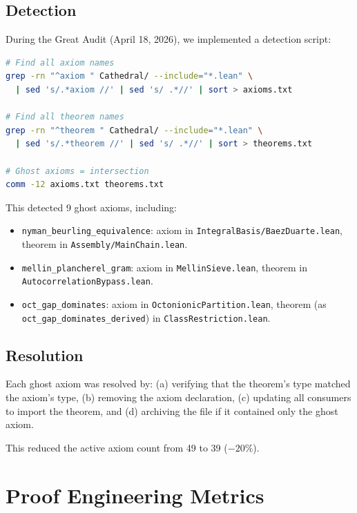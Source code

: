 \documentclass[11pt,a4paper]{article}
\theoremstyle{definition}
\newcommand{\lean}[1]{\texttt{#1}}
\begin{document}
\subsection{Detection}

During the Great Audit (April 18, 2026), we implemented a detection
script:

\begin{lstlisting}[language=bash,caption={Ghost axiom detection}]
# Find all axiom names
grep -rn "^axiom " Cathedral/ --include="*.lean" \
  | sed 's/.*axiom //' | sed 's/ .*//' | sort > axioms.txt

# Find all theorem names
grep -rn "^theorem " Cathedral/ --include="*.lean" \
  | sed 's/.*theorem //' | sed 's/ .*//' | sort > theorems.txt

# Ghost axioms = intersection
comm -12 axioms.txt theorems.txt
\end{lstlisting}

This detected 9 ghost axioms, including:
\begin{itemize}
  \item \lean{nyman\_beurling\_equivalence}: axiom in
    \lean{IntegralBasis/BaezDuarte.lean}, theorem in
    \lean{Assembly/MainChain.lean}.
  \item \lean{mellin\_plancherel\_gram}: axiom in
    \lean{MellinSieve.lean}, theorem in \lean{AutocorrelationBypass.lean}.
  \item \lean{oct\_gap\_dominates}: axiom in \lean{OctonionicPartition.lean},
    theorem (as \lean{oct\_gap\_dominates\_derived}) in
    \lean{ClassRestriction.lean}.
\end{itemize}

\subsection{Resolution}

Each ghost axiom was resolved by:
(a) verifying that the theorem's type matched the axiom's type,
(b) removing the axiom declaration,
(c) updating all consumers to import the theorem, and
(d) archiving the file if it contained only the ghost axiom.

This reduced the active axiom count from 49 to 39 ($-20\%$).

\section{Proof Engineering Metrics}
\label{sec:metrics}
\end{document}
